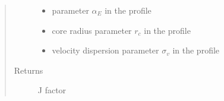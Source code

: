 \documentclass[letterpaper,10pt,english]{sphinxmanual}
\begin{document}
\begin{fulllineitems}
\begin{quote}
\begin{description}
\begin{itemize}
\item {} 
\sphinxAtStartPar
{} \textendash{} parameter \(\alpha_E\) in the {\hyperref[\detokenize{diffsph.profiles:diffsph.profiles.templates.enst}]{}} profile

\item {} 
\sphinxAtStartPar
{} \textendash{} core radius parameter \(r_c\) in the {\hyperref[\detokenize{diffsph.profiles:diffsph.profiles.templates.cnfw}]{}} profile

\item {} 
\sphinxAtStartPar
{} \textendash{} velocity dispersion parameter \(\sigma_v\) in the {\hyperref[\detokenize{diffsph.profiles:diffsph.profiles.templates.sis}]{}} profile

\end{itemize}

\item[{Returns}] \leavevmode
\sphinxAtStartPar
J factor

\end{description}\end{quote}

\end{fulllineitems}

\end{document}
